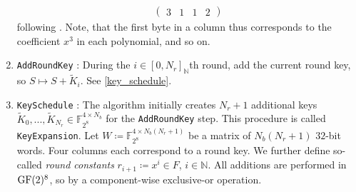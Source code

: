 \begin{enumerate}[label=(\roman*)]
\begin{align}
\begin{pmatrix}
            3 & 1 & 1 & 2
        \end{pmatrix}
    \end{align}
    following . Note, that the first byte in a column thus corresponds to the coefficient \(x^3\) in each polynomial, and so on.
    \item \texttt{AddRoundKey} \cite[p. 41]{Daemen_2020}: During the \(i \in [0, N_r]_{\mathbb{N}}\)th round, add the current round key, so \(S \mapsto S + \tilde{K}_i\). See \ref{key_schedule}.
    \item \label{key_schedule} \texttt{KeySchedule} \cite[pp. 43-46]{Daemen_2020}: The algorithm initially creates \(N_r+1\) additional keys \(\tilde{K}_0, ..., \tilde{K}_{N_r} \in \mathbb{F}_{2^8}^{4 \times N_b}\) for the \texttt{AddRoundKey} step. This procedure is called \texttt{KeyExpansion}. Let \(W \coloneqq \mathbb{F}_{2^8}^{4 \times N_b(N_r+1)}\) be a matrix of \(N_b(N_r+1)\) \(32\)-bit words. Four columns each correspond to a round key. We further define so-called \emph{round constants} \(r_{i+1} \coloneqq x^i \in F\), \(i \in \mathbb{N}\). All additions are performed in \(\operatorname{GF}(2)^8\), so by a component-wise exclusive-or operation.
    

\end{enumerate}
